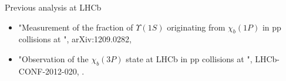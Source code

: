 \begin{frame}{Previous analysis at LHCb}
\begin{itemize}
\item "Measurement of the fraction of $\Upsilon(1S)$ originating from $\chi_b(1P)$ in pp collisions at \tev", arXiv:1209.0282,  \invpb
\item "Observation of the $\chi_b(3P)$ state at LHCb in pp collisions at \tev",
LHCb-CONF-2012-020,  \invfb.
\end{itemize}
\end{frame}